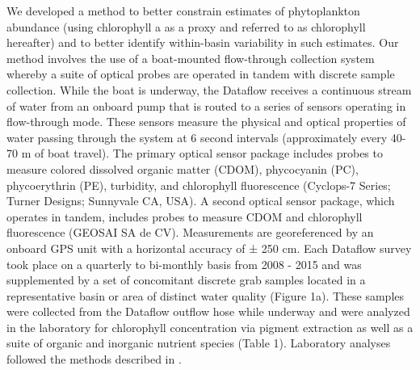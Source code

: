 \documentclass[review]{elsarticle}
\begin{document}
We developed a method to better constrain estimates of phytoplankton abundance (using chlorophyll a as a proxy and referred to as chlorophyll hereafter) and to better identify within-basin variability in such estimates. Our method involves the use of a boat-mounted flow-through collection system \citep[Dataflow;][]{madden1992instrument} whereby a suite of optical probes are operated in tandem with discrete sample collection. While the boat is underway, the Dataflow receives a continuous stream of water from an onboard pump that is routed to a series of sensors operating in flow-through mode. These sensors measure the physical and optical properties of water passing through the system at 6 second intervals (approximately every 40-70 m of boat travel). The primary optical sensor package includes probes to measure  colored dissolved organic matter (CDOM), phycocyanin (PC), phycoerythrin (PE), turbidity, and chlorophyll fluorescence (Cyclops-7 Series; Turner Designs; Sunnyvale CA, USA). A second optical sensor package, which operates in tandem, includes probes to measure CDOM and chlorophyll fluorescence (GEOSAI SA de CV). Measurements are georeferenced by an onboard GPS unit with a horizontal accuracy of ± 250 cm. Each Dataflow survey took place on a quarterly to bi-monthly basis from 2008 - 2015 and was supplemented by a set of concomitant discrete grab samples located in a representative basin or area of distinct water quality (Figure 1a). These samples were collected from the Dataflow outflow hose while underway and were analyzed in the laboratory for chlorophyll concentration via pigment extraction as well as a suite of organic and inorganic nutrient species (Table 1). Laboratory analyses followed the methods described in \citet{childers_relating_2006}.
\end{document}
